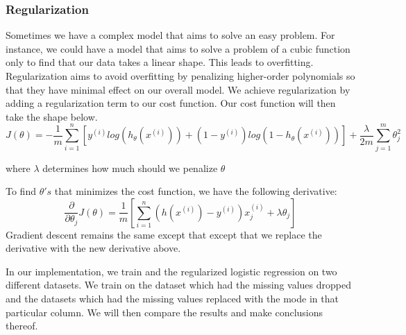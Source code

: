 \subsubsection{Regularization}
Sometimes we have a complex model that aims to solve an easy problem. For instance, we could have a model that aims to solve a problem of a cubic function only to find that our data takes a linear shape. This leads to overfitting. Regularization aims to avoid overfitting by penalizing higher-order polynomials so that they have minimal effect on our overall model. We achieve regularization by adding a regularization term to our cost function. Our cost function will then take the shape below.
\begin{equation}
    J(\theta) = -\frac{1}{m}\sum_{i=1}^{n}[y^{(i)}log(h_{\theta}(x^{(i)})) + (1-y^{(i)})log(1-h_{\theta}(x^{(i)}))] +\frac{\lambda}{2m}\sum_{j=1}^m \theta_j^2 
\end{equation}

where $\lambda$ determines how much should we penalize $\theta$

To find $\theta's$ that minimizes the cost function, we have the following derivative:
\begin{equation}
    \frac{\partial}{\partial \theta_j}J(\theta) = \frac{1}{m}[ \sum_{i=1}^n(h(x^{(i)}) - y^{(i)})x_j^{(i)} + \lambda \theta_j ] 
\end{equation}
Gradient descent remains the same except that except that we replace the derivative with the new derivative above.

In our implementation, we train and the regularized logistic regression on two different datasets. We train on the dataset which had the missing values dropped and the datasets which had the missing values replaced with the mode in that particular column. We will then compare the results and make conclusions thereof.


